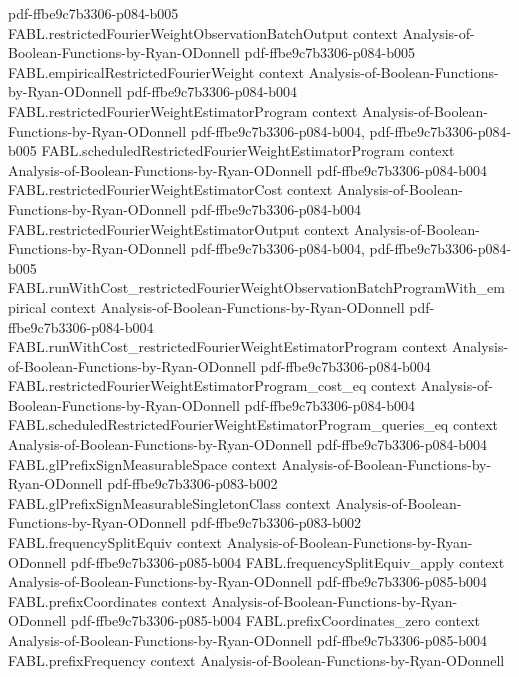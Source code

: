 \begin{theorem}
  {pdf-ffbe9c7b3306-p084-b005}
\proofstep
  {FABL.restrictedFourierWeightObservationBatchOutput}
  {context}
  {Analysis-of-Boolean-Functions-by-Ryan-ODonnell}
  {pdf-ffbe9c7b3306-p084-b005}
\proofstep
  {FABL.empiricalRestrictedFourierWeight}
  {context}
  {Analysis-of-Boolean-Functions-by-Ryan-ODonnell}
  {pdf-ffbe9c7b3306-p084-b004}
\proofstep
  {FABL.restrictedFourierWeightEstimatorProgram}
  {context}
  {Analysis-of-Boolean-Functions-by-Ryan-ODonnell}
  {pdf-ffbe9c7b3306-p084-b004,
    pdf-ffbe9c7b3306-p084-b005}
\proofstep
  {FABL.scheduledRestrictedFourierWeightEstimatorProgram}
  {context}
  {Analysis-of-Boolean-Functions-by-Ryan-ODonnell}
  {pdf-ffbe9c7b3306-p084-b004}
\proofstep
  {FABL.restrictedFourierWeightEstimatorCost}
  {context}
  {Analysis-of-Boolean-Functions-by-Ryan-ODonnell}
  {pdf-ffbe9c7b3306-p084-b004}
\proofstep
  {FABL.restrictedFourierWeightEstimatorOutput}
  {context}
  {Analysis-of-Boolean-Functions-by-Ryan-ODonnell}
  {pdf-ffbe9c7b3306-p084-b004,
    pdf-ffbe9c7b3306-p084-b005}
\proofstep
  {FABL.runWithCost_restrictedFourierWeightObservationBatchProgramWith_empirical}
  {context}
  {Analysis-of-Boolean-Functions-by-Ryan-ODonnell}
  {pdf-ffbe9c7b3306-p084-b004}
\proofstep
  {FABL.runWithCost_restrictedFourierWeightEstimatorProgram}
  {context}
  {Analysis-of-Boolean-Functions-by-Ryan-ODonnell}
  {pdf-ffbe9c7b3306-p084-b004}
\proofstep
  {FABL.restrictedFourierWeightEstimatorProgram_cost_eq}
  {context}
  {Analysis-of-Boolean-Functions-by-Ryan-ODonnell}
  {pdf-ffbe9c7b3306-p084-b004}
\proofstep
  {FABL.scheduledRestrictedFourierWeightEstimatorProgram_queries_eq}
  {context}
  {Analysis-of-Boolean-Functions-by-Ryan-ODonnell}
  {pdf-ffbe9c7b3306-p084-b004}
\proofstep
  {FABL.glPrefixSignMeasurableSpace}
  {context}
  {Analysis-of-Boolean-Functions-by-Ryan-ODonnell}
  {pdf-ffbe9c7b3306-p083-b002}
\proofstep
  {FABL.glPrefixSignMeasurableSingletonClass}
  {context}
  {Analysis-of-Boolean-Functions-by-Ryan-ODonnell}
  {pdf-ffbe9c7b3306-p083-b002}
\proofstep
  {FABL.frequencySplitEquiv}
  {context}
  {Analysis-of-Boolean-Functions-by-Ryan-ODonnell}
  {pdf-ffbe9c7b3306-p085-b004}
\proofstep
  {FABL.frequencySplitEquiv_apply}
  {context}
  {Analysis-of-Boolean-Functions-by-Ryan-ODonnell}
  {pdf-ffbe9c7b3306-p085-b004}
\proofstep
  {FABL.prefixCoordinates}
  {context}
  {Analysis-of-Boolean-Functions-by-Ryan-ODonnell}
  {pdf-ffbe9c7b3306-p085-b004}
\proofstep
  {FABL.prefixCoordinates_zero}
  {context}
  {Analysis-of-Boolean-Functions-by-Ryan-ODonnell}
  {pdf-ffbe9c7b3306-p085-b004}
\proofstep
  {FABL.prefixFrequency}
  {context}
  {Analysis-of-Boolean-Functions-by-Ryan-ODonnell}

\end{theorem}
